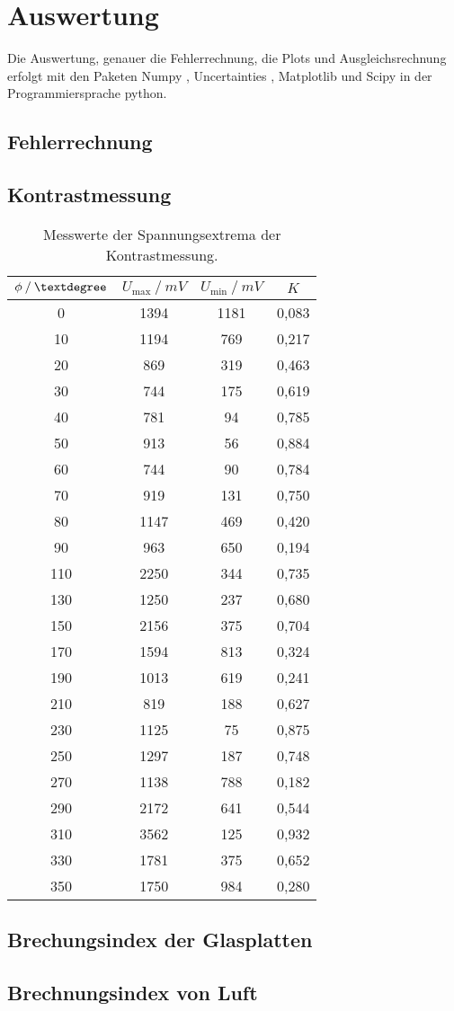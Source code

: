 \section{Auswertung}
Die Auswertung, genauer die Fehlerrechnung, die Plots und Ausgleichsrechnung erfolgt mit den Paketen
Numpy \cite{numpy}, Uncertainties \cite{uncertainties}, Matplotlib \cite{matplotlib} und Scipy \cite{scipy} in der Programmiersprache python.
\subsection{Fehlerrechnung}

\subsection{Kontrastmessung}

\begin{table}[H]
\centering
\begin{tabular}{c|c|c|c}
{$\phi \:/\: \textdegree$} & {$U_\text{max} \:/\: \si{mV}$} & {$U_\text{min} \:/\: \si{mV}$} & {$K$}\\
\midrule
0 & 1394 & 1181 & 0,083 \\
10 & 1194 & 769 & 0,217 \\
20 & 869 & 319 & 0,463 \\
30 & 744 & 175 & 0,619 \\
40 & 781 & 94 & 0,785 \\
50 & 913 & 56 & 0,884 \\
60 & 744 & 90 & 0,784 \\
70 & 919 & 131 & 0,750 \\
80 & 1147 & 469 & 0,420 \\
90 & 963 & 650 & 0,194 \\
110 & 2250 & 344 & 0,735 \\
130 & 1250 & 237 & 0,680 \\
150 & 2156 & 375 & 0,704 \\
170 & 1594 & 813 & 0,324 \\
190 & 1013 & 619 & 0,241 \\
210 & 819 & 188 & 0,627 \\
230 & 1125 & 75 & 0,875 \\
250 & 1297 & 187 & 0,748 \\
270 & 1138 & 788 & 0,182 \\
290 & 2172 & 641 & 0,544 \\
310 & 3562 & 125 & 0,932 \\
330 & 1781 & 375 & 0,652 \\
350 & 1750 & 984 & 0,280 \\
\end{tabular}
\caption{Messwerte der Spannungsextrema der Kontrastmessung.}
\label{tab:kontrast}
\end{table}

\subsection{Brechungsindex der Glasplatten}


\subsection{Brechnungsindex von Luft}
